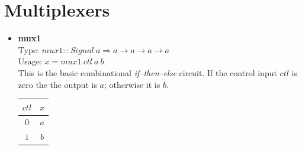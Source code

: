 \documentclass[a4paper,openany,fleqn]{book}
\begin{document}
\section{Multiplexers}
\label{sec:multiplexers}

\begin{itemize}
\item \textbf{mux1} \\
  Type: $\mathit{mux1} :: \mathit{Signal}\ a \Rightarrow a
  \rightarrow a \rightarrow a \rightarrow a$ \\
  Usage: $x = \mathit{mux1}\ \mathit{ctl}\ a\ b$ \\
  This is the basic combinational \textit{if--then--else} circuit.  If
  the control input $\mathit{ctl}$ is zero the the output is $a$;
  otherwise it is $b$.
  \begin{center}
    \begin{tabular}[c]{c|c}
      $\mathit{ctl}$ & $x$ \\
      \hline
      $0$ & $a$ \\
      $1$ & $b$
    \end{tabular}
  \end{center}


\end{itemize}
\end{document}
